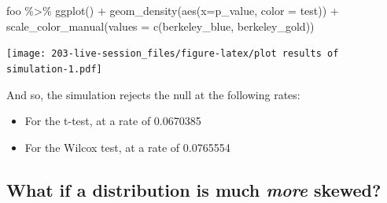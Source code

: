 \documentclass[
]{book}
\newenvironment{Shaded}{\begin{snugshade}}{\end{snugshade}}
\newcommand{\AttributeTok}[1]{\textcolor[rgb]{0.77,0.63,0.00}{#1}}
\newcommand{\FunctionTok}[1]{\textcolor[rgb]{0.00,0.00,0.00}{#1}}
\newcommand{\NormalTok}[1]{#1}
\newcommand{\SpecialCharTok}[1]{\textcolor[rgb]{0.00,0.00,0.00}{#1}}
\providecommand{\tightlist}{%
  \setlength{\itemsep}{0pt}\setlength{\parskip}{0pt}}
\theoremstyle{definition}
\theoremstyle{definition}
\theoremstyle{definition}
\theoremstyle{definition}
\theoremstyle{remark}
\begin{document}
\begin{Shaded}
\begin{Highlighting}[]
\NormalTok{foo }\SpecialCharTok{\%\textgreater{}\%}
  \FunctionTok{ggplot}\NormalTok{() }\SpecialCharTok{+}
  \FunctionTok{geom\_density}\NormalTok{(}\FunctionTok{aes}\NormalTok{(}\AttributeTok{x=}\NormalTok{p\_value, }\AttributeTok{color =}\NormalTok{ test)) }\SpecialCharTok{+}
  \FunctionTok{scale\_color\_manual}\NormalTok{(}\AttributeTok{values =} \FunctionTok{c}\NormalTok{(berkeley\_blue, berkeley\_gold))}
\end{Highlighting}
\end{Shaded}

\texttt{[image: 203-live-session\_files/figure-latex/plot results of simulation-1.pdf]}

And so, the simulation rejects the null at the following rates:

\begin{itemize}
\tightlist
\item
  For the t-test, at a rate of 0.0670385
\item
  For the Wilcox test, at a rate of 0.0765554
\end{itemize}

\hypertarget{what-if-a-distribution-is-much-more-skewed}{%
\subsection{\texorpdfstring{What if a distribution is much \emph{more} skewed?}{What if a distribution is much more skewed?}}\label{what-if-a-distribution-is-much-more-skewed}}
\end{document}

